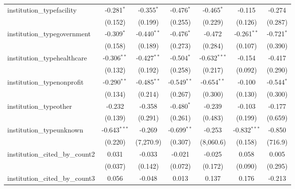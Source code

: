 \begin{tabular}{lcccccc}
   institution\_typefacility             & -0.281$^{*}$   & -0.355$^{*}$  & -0.476$^{*}$   & -0.465$^{*}$   & -0.115         & -0.274\\   
                                         & (0.152)        & (0.199)       & (0.255)        & (0.229)        & (0.126)        & (0.287)\\   
   institution\_typegovernment           & -0.309$^{*}$   & -0.440$^{**}$ & -0.476$^{*}$   & -0.472         & -0.261$^{**}$  & -0.721$^{*}$\\   
                                         & (0.158)        & (0.189)       & (0.273)        & (0.284)        & (0.107)        & (0.390)\\   
   institution\_typehealthcare           & -0.306$^{**}$  & -0.427$^{**}$ & -0.504$^{*}$   & -0.632$^{***}$ & -0.154         & -0.417\\   
                                         & (0.132)        & (0.192)       & (0.258)        & (0.217)        & (0.092)        & (0.290)\\   
   institution\_typenonprofit            & -0.290$^{**}$  & -0.485$^{**}$ & -0.549$^{**}$  & -0.654$^{**}$  & -0.100         & -0.544$^{*}$\\   
                                         & (0.134)        & (0.214)       & (0.267)        & (0.300)        & (0.130)        & (0.300)\\   
   institution\_typeother                & -0.232         & -0.358        & -0.480$^{*}$   & -0.239         & -0.103         & -0.177\\   
                                         & (0.139)        & (0.291)       & (0.261)        & (0.483)        & (0.199)        & (0.659)\\   
   institution\_typeunknown              & -0.643$^{***}$ & -0.269        & -0.699$^{**}$  & -0.253         & -0.832$^{***}$ & -0.850\\   
                                         & (0.220)        & (7,270.9)     & (0.307)        & (8,060.6)      & (0.158)        & (716.9)\\   
   institution\_cited\_by\_count2        & 0.031          & -0.033        & -0.021         & -0.025         & 0.058          & 0.005\\   
                                         & (0.037)        & (0.142)       & (0.072)        & (0.172)        & (0.090)        & (0.295)\\   
   institution\_cited\_by\_count3        & 0.056          & -0.048        & 0.013          & 0.137          & 0.176          & -0.213\\   

\end{tabular}

